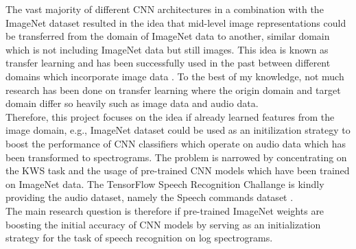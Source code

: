 \documentclass{article}
\theoremstyle{definition}
\theoremstyle{remark}
\begin{document}
The vast majority of different CNN architectures in a combination with the ImageNet dataset resulted in the idea that mid-level image representations could be transferred from the domain of ImageNet data to another, similar domain which is not including ImageNet data but still images. This idea is known as transfer learning and has been successfully used in the past between different domains which incorporate image data \cite{oquab2014learning}. To the best of my knowledge, not much research has been done on transfer learning where the origin domain and target domain differ so heavily such as image data and audio data.\\

Therefore, this project focuses on the idea if already learned features from the image domain, e.g., ImageNet dataset could be used as an initilization strategy to boost the performance of CNN classifiers which operate on audio data which has been transformed to spectrograms. The problem is narrowed by concentrating on the KWS task and the usage of pre-trained CNN models which have been trained on ImageNet data. The TensorFlow Speech Recognition Challange \cite{kaggle_challenge} is kindly providing the audio dataset, namely the Speech commands dataset \cite{scd_v1}.\\

The main research question is therefore if pre-trained ImageNet weights are boosting the initial accuracy of CNN models by serving as an initialization strategy for the task of speech recognition on log spectrograms.\\
\end{document}
